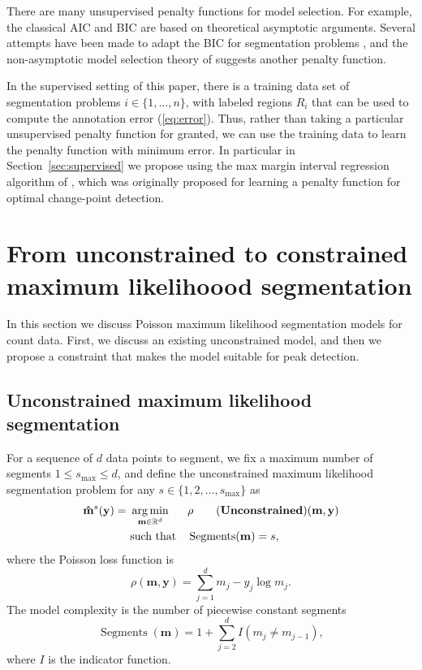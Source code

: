 \documentclass{article}
\DeclareMathOperator*{\argmin}{arg\,min}
\DeclareMathOperator*{\Segments}{Segments}
\newcommand{\RR}{\mathbb R}
\begin{document}
There are many unsupervised penalty functions for model selection. For
example, the classical AIC \citep{Akaike73} and BIC \citep{Schwarz78} are based
on theoretical asymptotic arguments. Several attempts have been made
to adapt the BIC for segmentation problems \citep{Yao88,
  mBIC}, and the non-asymptotic model selection theory of
\citet{cleynen2013segmentation} suggests another penalty function.

In the supervised setting of this paper, there is a training data set
of segmentation problems $i\in\{1, \dots, n\}$, with labeled regions
$R_i$ that can be used to compute the annotation error
(\ref{eq:error}). Thus, rather than taking a particular unsupervised
penalty function for granted, we can use the training data to learn
the penalty function with minimum error. In particular in
Section~\ref{sec:supervised} we propose using the max margin interval
regression algorithm of \citet{HOCKING-penalties}, which was
originally proposed for learning a penalty function for optimal
change-point detection.

\section{From unconstrained to constrained maximum likelihoood
  segmentation}
\label{sec:model}

In this section we discuss Poisson maximum likelihood segmentation
models for count data. First, we discuss an existing unconstrained
model, and then we propose a constraint that makes the model suitable
for peak detection.

\subsection{Unconstrained maximum likelihood segmentation}

For a sequence of $d$ data points to segment, we fix a maximum number
of segments $1 \leq s_{\text{max}}\leq d$, and define the
unconstrained maximum likelihood segmentation problem for
any $s\in\{1, 2, \dots, s_{\max}\}$ as
\begin{align*}
  \label{unconstrained}
  \mathbf{\hat m}^s(\mathbf y)  =\ 
  &\argmin_{\mathbf m\in\RR^{d}} && 
  \rho
  \tag{\textbf{Unconstrained}}
  (\mathbf m, \mathbf y) \\
  &\text{such that} && \Segments(\mathbf m)=s,
\end{align*}
where the Poisson loss function is
\begin{equation}
  \rho(\mathbf m, \mathbf y)= \sum_{j=1}^d m_j - y_j \log m_j.
\end{equation} 
The model complexity is the number of piecewise constant segments
\begin{equation}
  \Segments(\mathbf m)=1+\sum_{j=2}^d I(m_j \neq m_{j-1}),
\end{equation}
where $I$ is the indicator function. 
\end{document}
